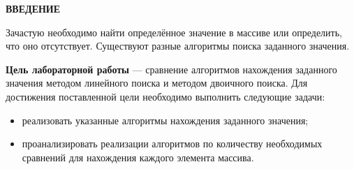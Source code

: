 \begin{center}
    \textbf{ВВЕДЕНИЕ}
\end{center}

Зачастую необходимо найти определённое значение в массиве или определить, что оно отсутствует.
Существуют разные алгоритмы поиска заданного значения.

\textbf{Цель лабораторной работы} --- сравнение алгоритмов нахождения заданного значения
методом линейного поиска и методом двоичного поиска.
Для достижения поставленной цели необходимо выполнить следующие задачи:

\begin{itemize}
	\item реализовать указанные алгоритмы нахождения заданного значения;
    \item проанализировать реализации алгоритмов по количеству необходимых сравнений для нахождения каждого элемента массива.
\end{itemize}